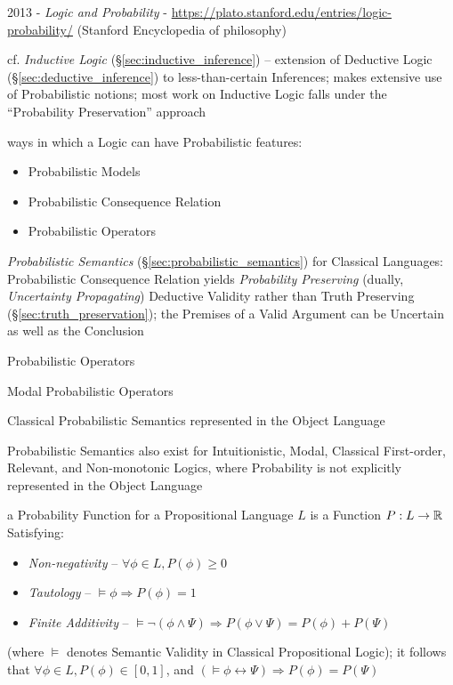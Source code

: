 2013 - \emph{Logic and Probability} -
\url{https://plato.stanford.edu/entries/logic-probability/} (Stanford
Encyclopedia of philosophy)

cf. \emph{Inductive Logic} (\S\ref{sec:inductive_inference}) -- extension of
Deductive Logic (\S\ref{sec:deductive_inference}) to less-than-certain
Inferences; makes extensive use of Probabilistic notions; most work on Inductive
Logic falls under the ``Probability Preservation'' approach

ways in which a Logic can have Probabilistic features:
\begin{itemize}
  \item Probabilistic Models
  \item Probabilistic Consequence Relation
  \item Probabilistic Operators
\end{itemize}

\emph{Probabilistic Semantics} (\S\ref{sec:probabilistic_semantics}) for
Classical Languages: Probabilistic Consequence Relation yields \emph{Probability
  Preserving} (dually, \emph{Uncertainty Propagating}) Deductive Validity rather
than Truth Preserving (\S\ref{sec:truth_preservation}); the Premises of a Valid
Argument can be Uncertain as well as the Conclusion

Probabilistic Operators

Modal Probabilistic Operators

Classical Probabilistic Semantics represented in the Object Language

Probabilistic Semantics also exist for Intuitionistic, Modal, Classical
First-order, Relevant, and Non-monotonic Logics, where Probability is not
explicitly represented in the Object Language

a Probability Function for a Propositional Language $L$ is a Function $P : L
\rightarrow \mathbb{R}$ Satisfying:
\begin{itemize}
  \item \emph{Non-negativity} -- $\forall \phi \in L, P(\phi) \geq 0$
  \item \emph{Tautology} -- $\vDash\phi \Rightarrow P(\phi) = 1$
  \item \emph{Finite Additivity} --
     $\vDash\neg(\phi\wedge\Psi) \Rightarrow P(\phi\vee\Psi) = P(\phi) + P(\Psi)$
\end{itemize}
(where $\vDash$ denotes Semantic Validity in Classical Propositional Logic); it
follows that $\forall \phi\in L, P(\phi) \in [0,1]$, and
$(\vDash\phi\leftrightarrow\Psi) \Rightarrow P(\phi) = P(\Psi)$

